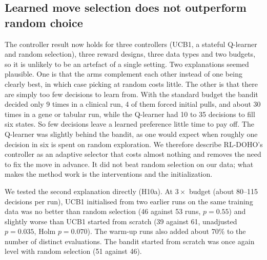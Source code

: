 \documentclass[pdflatex,sn-basic]{sn-jnl}
\begin{document}
\subsection{Learned move selection does not outperform random choice}
The controller result now holds for three controllers (UCB1, a stateful Q-learner and random selection), three reward designs, three data types and two budgets, so it is unlikely to be an artefact of a single setting. Two explanations seemed plausible. One is that the arms complement each other instead of one being clearly best, in which case picking at random costs little. The other is that there are simply too few decisions to learn from. With the standard budget the bandit decided only 9 times in a clinical run, 4 of them forced initial pulls, and about 30 times in a gene or tabular run, while the Q-learner had 10 to 35 decisions to fill six states. So few decisions leave a learned preference little time to pay off. The Q-learner was slightly behind the bandit, as one would expect when roughly one decision in six is spent on random exploration. We therefore describe RL-DOHO's controller as an adaptive selector that costs almost nothing and removes the need to fix the move in advance. It did not beat random selection on our data; what makes the method work is the interventions and the initialization.

We tested the second explanation directly (H10a). At $3\times$ budget (about 80--115 decisions per run), UCB1 initialised from two earlier runs on the same training data was no better than random selection (46 against 53 runs, $p=0.55$) and slightly worse than UCB1 started from scratch (39 against 61, unadjusted $p=0.035$, Holm $p=0.070$). The warm-up runs also added about 70\% to the number of distinct evaluations. The bandit started from scratch was once again level with random selection (51 against 46).
\end{document}
